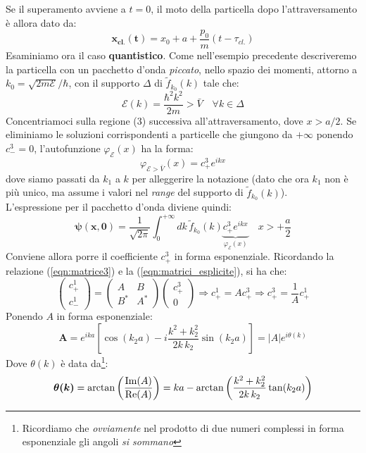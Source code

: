 \documentclass[../../FisicaTeorica.tex]{subfiles}
\begin{document}
Se il superamento avviene a $t=0$, il moto della particella dopo l'attraversamento è allora dato da:
\begin{equation}
\bm{x_{cl.}(t)}=x_0 +a+\frac{p_0}{m}(t-\tau_{cl.})
\label{eqn:moto_classico_rettangolare}
\end{equation}
Esaminiamo ora il caso \textbf{quantistico}. Come nell'esempio precedente descriveremo la particella con un pacchetto d'onda \textit{piccato}, nello spazio dei momenti, attorno a $k_0=\sqrt{2m\mathcal{E}}/\hbar$, con il supporto $\Delta$ di $\tilde{f}_{k_0}(k)$ tale che:
\[
\mathcal{E}(k)=\frac{\hbar^2 k^2}{2m}>\bar{V}\quad \forall k \in \Delta
\]
Concentriamoci sulla regione (3) successiva all'attraversamento, dove $x>a/2$. Se eliminiamo le soluzioni corrispondenti a particelle che giungono da $+\infty$ ponendo $c^3_- =0$, l'autofunzione $\varphi_\mathcal{E}(x)$ ha la forma:
\[
\varphi_{\mathcal{E}>\bar{V}}(x)=c^3_+ e^{ikx}
\]
dove siamo passati da $k_1$ a $k$ per alleggerire la notazione (dato che ora $k_1$ non è più unico, ma assume i valori nel \textit{range} del supporto di $\tilde{f}_{k_0}(k)$).\\
L'espressione per il pacchetto d'onda diviene quindi:
\begin{equation}
\bm{\psi(x,0)}=\frac{1}{\sqrt{2\pi}}\int_0^{+\infty} dk\,\tilde{f}_{k_0}(k)\underbrace{c^3_+ e^{ikx}}_{\varphi_\mathcal{E}(x)}\quad x>+\frac{a}{2}
\label{eqn:pacchetto_rettangolare_zero}
\end{equation}
Conviene allora porre il coefficiente $c^3_+$ in forma esponenziale. Ricordando la relazione (\ref{eqn:matrice3}) e la (\ref{eqn:matrici_esplicite}), si ha che:
\[
\begin{pmatrix}
c^1_+\\
c^1_-
\end{pmatrix} = \begin{pmatrix}A & B\\B^* & A^* \end{pmatrix}\begin{pmatrix}
c^3_+\\
0
\end{pmatrix} \Rightarrow c^1_+ = Ac^3_+ \Rightarrow  c^3_+ = \frac{1}{A}c^1_+
\]
Ponendo $A$ in forma esponenziale:
\[
\bm{A}=e^{ik a}\left [
\cos( k_2 a) - i\frac{k^2+k_2^2}{2k\,k_2}\sin (k_2 a)
\right ] = |A|e^{i\theta(k)}
\]
Dove $\theta(k)$ è data da\footnote{Ricordiamo che \textit{ovviamente} nel prodotto di due numeri complessi in forma esponenziale gli angoli \textit{si sommano}}:
\begin{equation}
\bm{\theta(k)}=\arctan\left(\frac{\operatorname{Im}(A)}{\operatorname{Re}(A)}\right)
=k a - \arctan \left( \frac{k^2+k_2^2}{2k\,k_2}\tan (k_2 a)\right)
\label{eqn:thetak}
\end{equation}
\end{document}
